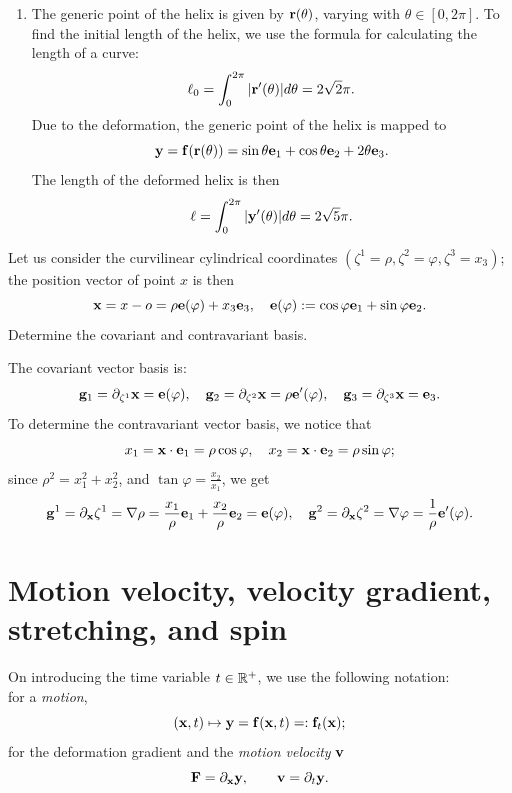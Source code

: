 \begin{exercise}
\begin{svolgimento}
\begin{enumerate}
			\item The generic point of the helix is given by $\mathbf{r}(\theta)$, varying with $\theta \in [0, 2\pi]$. To find the initial length of the helix, we use the formula for calculating the length of a curve:
			\begin{equation}
				\ell_0 = \int_0^{2\pi} |\mathbf{r}'(\theta)| d\theta = 2\sqrt{2} \pi.
			\end{equation}
			Due to the deformation, the generic point of the helix is mapped to
			\begin{equation}
				\mathbf{y} = \mathbf{f}(\mathbf{r}(\theta)) = \sin\theta \mathbf{e}_1 + \cos\theta \mathbf{e}_2 + 2\theta \mathbf{e}_3.
			\end{equation}
			The length of the deformed helix is then
			\begin{equation}
				\ell = \int_0^{2\pi} |\mathbf{y}'(\theta)| d\theta = 2\sqrt{5} \pi.
			\end{equation}
		\end{enumerate}
	\end{svolgimento}
	
\end{exercise}

\begin{exercise}
Let us consider 
		the curvilinear cylindrical coordinates $(\zeta^1=\rho,\zeta^2=\varphi,\zeta^3=x_3)$; the position vector of point $x$ is then
		$$
		\mathbf{x}=x-o=\rho\mathbf{e}(\varphi)+x_3\mathbf{e}_3, \quad \mathbf{e}(\varphi):=\cos\varphi\mathbf{e}_1+\sin\varphi \mathbf{e}_2.
		$$
Determine the covariant and contravariant basis.

\begin{svolgimento}
			The covariant vector basis is:
		\begin{equation}
			\mathbf{g}_1=\partial_{\zeta^1}\mathbf{x}=\mathbf{e}(\varphi), \quad \mathbf{g}_2=\partial_{\zeta^2}\mathbf{x}=\rho\mathbf{e}'(\varphi), \quad \mathbf{g}_3=\partial_{\zeta^3}\mathbf{x}=\mathbf{e}_3.
		\end{equation}
		To determine the contravariant vector basis, we notice that
		$$
		x_1=\mathbf{x}\cdot\mathbf{e}_1=\rho\cos\varphi, \quad x_2=\mathbf{x}\cdot\mathbf{e}_2=\rho\sin\varphi;
		$$
		since $\rho^2=x_1^2+x_2^2$, and $\tan\varphi=\frac{x_2}{x_1}$, we get
		$$
		\mathbf{g}^1=\partial_{\mathbf{x}}\zeta^1=\nabla\rho=\frac{x_1}{\rho}\mathbf{e}_1+\frac{x_2}{\rho}\mathbf{e}_2=\mathbf{e}(\varphi), \quad 
		\mathbf{g}^2=\partial_{\mathbf{x}}\zeta^2=\nabla\varphi=\frac{1}{\rho}\mathbf{e}'(\varphi).
		$$
\end{svolgimento}
	
\end{exercise}

\section{Motion velocity, velocity gradient, stretching, and spin}
On introducing the time variable $t\in\mathbb{R}^+$, we use the following notation:\\
\noindent for a \textit{motion},
\begin{equation}
	(\mathbf{x},t)\mapsto \mathbf{y}=\mathbf{f}(\mathbf{x},t)=:\mathbf{f}_t(\mathbf{x});
\end{equation} 
for the deformation gradient and the \textit{motion velocity} $\mathbf{v}$
\begin{equation}
	\mathbf{F}=\partial_{\mathbf{x}} \mathbf{y}, \qquad \mathbf{v}=\partial_t \mathbf{y}.
\end{equation}


